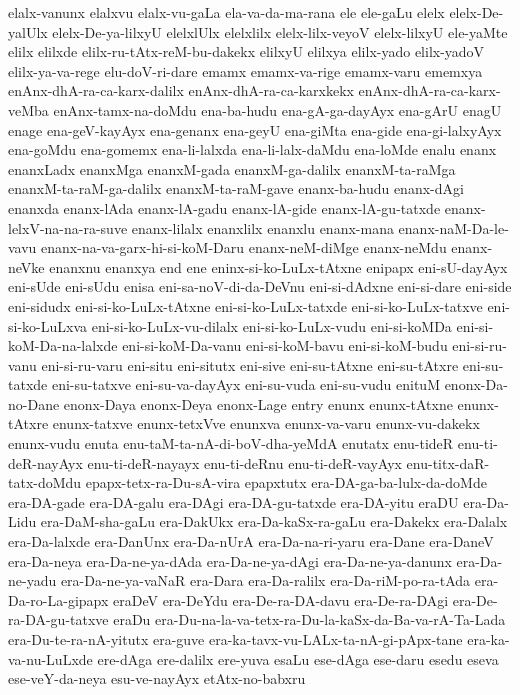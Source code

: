{elalx-vanunx
elalxvu
elalx-vu-gaLa
ela-va-da-ma-rana
ele
ele-gaLu
elelx
elelx-De-yalUlx
elelx-De-ya-lilxyU
elelxlUlx
elelxlilx
elelx-lilx-veyoV
elelx-lilxyU
ele-yaMte
elilx
elilxde
elilx-ru-tAtx-reM-bu-dakekx
elilxyU
elilxya
elilx-yado
elilx-yadoV
elilx-ya-va-rege
elu-doV-ri-dare
emamx
emamx-va-rige
emamx-varu
ememxya
enAnx-dhA-ra-ca-karx-dalilx
enAnx-dhA-ra-ca-karxkekx
enAnx-dhA-ra-ca-karx-veMba
enAnx-tamx-na-doMdu
ena-ba-hudu
ena-gA-ga-dayAyx
ena-gArU
enagU
enage
ena-geV-kayAyx
ena-genanx
ena-geyU
ena-giMta
ena-gide
ena-gi-lalxyAyx
ena-goMdu
ena-gomemx
ena-li-lalxda
ena-li-lalx-daMdu
ena-loMde
enalu
enanx
enanxLadx
enanxMga
enanxM-gada
enanxM-ga-dalilx
enanxM-ta-raMga
enanxM-ta-raM-ga-dalilx
enanxM-ta-raM-gave
enanx-ba-hudu
enanx-dAgi
enanxda
enanx-lAda
enanx-lA-gadu
enanx-lA-gide
enanx-lA-gu-tatxde
enanx-lelxV-na-na-ra-suve
enanx-lilalx
enanxlilx
enanxlu
enanx-mana
enanx-naM-Da-le-vavu
enanx-na-va-garx-hi-si-koM-Daru
enanx-neM-diMge
enanx-neMdu
enanx-neVke
enanxnu
enanxya
end
ene
eninx-si-ko-LuLx-tAtxne
enipapx
eni-sU-dayAyx
eni-sUde
eni-sUdu
enisa
eni-sa-noV-di-da-DeVnu
eni-si-dAdxne
eni-si-dare
eni-side
eni-sidudx
eni-si-ko-LuLx-tAtxne
eni-si-ko-LuLx-tatxde
eni-si-ko-LuLx-tatxve
eni-si-ko-LuLxva
eni-si-ko-LuLx-vu-dilalx
eni-si-ko-LuLx-vudu
eni-si-koMDa
eni-si-koM-Da-na-lalxde
eni-si-koM-Da-vanu
eni-si-koM-bavu
eni-si-koM-budu
eni-si-ru-vanu
eni-si-ru-varu
eni-situ
eni-situtx
eni-sive
eni-su-tAtxne
eni-su-tAtxre
eni-su-tatxde
eni-su-tatxve
eni-su-va-dayAyx
eni-su-vuda
eni-su-vudu
enituM
enonx-Da-no-Dane
enonx-Daya
enonx-Deya
enonx-Lage
entry
enunx
enunx-tAtxne
enunx-tAtxre
enunx-tatxve
enunx-tetxVve
enunxva
enunx-va-varu
enunx-vu-dakekx
enunx-vudu
enuta
enu-taM-ta-nA-di-boV-dha-yeMdA
enutatx
enu-tideR
enu-ti-deR-nayAyx
enu-ti-deR-nayayx
enu-ti-deRnu
enu-ti-deR-vayAyx
enu-titx-daR-tatx-doMdu
epapx-tetx-ra-Du-sA-vira
epapxtutx
era-DA-ga-ba-lulx-da-doMde
era-DA-gade
era-DA-galu
era-DAgi
era-DA-gu-tatxde
era-DA-yitu
eraDU
era-Da-Lidu
era-DaM-sha-gaLu
era-DakUkx
era-Da-kaSx-ra-gaLu
era-Dakekx
era-Dalalx
era-Da-lalxde
era-DanUnx
era-Da-nUrA
era-Da-na-ri-yaru
era-Dane
era-DaneV
era-Da-neya
era-Da-ne-ya-dAda
era-Da-ne-ya-dAgi
era-Da-ne-ya-danunx
era-Da-ne-yadu
era-Da-ne-ya-vaNaR
era-Dara
era-Da-ralilx
era-Da-riM-po-ra-tAda
era-Da-ro-La-gipapx
eraDeV
era-DeYdu
era-De-ra-DA-davu
era-De-ra-DAgi
era-De-ra-DA-gu-tatxve
eraDu
era-Du-na-la-va-tetx-ra-Du-la-kaSx-da-Ba-va-rA-Ta-Lada
era-Du-te-ra-nA-yitutx
era-guve
era-ka-tavx-vu-LALx-ta-nA-gi-pApx-tane
era-ka-va-nu-LuLxde
ere-dAga
ere-dalilx
ere-yuva
esaLu
ese-dAga
ese-daru
esedu
eseva
ese-veY-da-neya
esu-ve-nayAyx
etAtx-no-babxru
}
